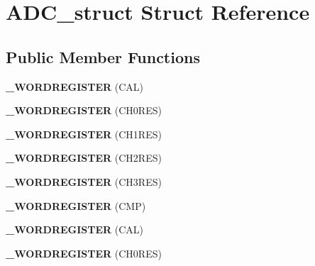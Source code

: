 \hypertarget{struct_a_d_c__struct}{}\section{A\+D\+C\+\_\+struct Struct Reference}
\label{struct_a_d_c__struct}
\subsection*{Public Member Functions}
\begin{DoxyCompactItemize}
\item 
{\bfseries \+\_\+\+W\+O\+R\+D\+R\+E\+G\+I\+S\+T\+ER} (C\+AL)\hypertarget{struct_a_d_c__struct_ab421dc830ed154a2e9acc357023215f9}{}\label{struct_a_d_c__struct_ab421dc830ed154a2e9acc357023215f9}

\item 
{\bfseries \+\_\+\+W\+O\+R\+D\+R\+E\+G\+I\+S\+T\+ER} (C\+H0\+R\+ES)\hypertarget{struct_a_d_c__struct_aa9eea8eae789e3fbecab731d0993d128}{}\label{struct_a_d_c__struct_aa9eea8eae789e3fbecab731d0993d128}

\item 
{\bfseries \+\_\+\+W\+O\+R\+D\+R\+E\+G\+I\+S\+T\+ER} (C\+H1\+R\+ES)\hypertarget{struct_a_d_c__struct_a7524b4641494c231ed83cd93013818c7}{}\label{struct_a_d_c__struct_a7524b4641494c231ed83cd93013818c7}

\item 
{\bfseries \+\_\+\+W\+O\+R\+D\+R\+E\+G\+I\+S\+T\+ER} (C\+H2\+R\+ES)\hypertarget{struct_a_d_c__struct_a388548845f09fe7a65eff4adb7470536}{}\label{struct_a_d_c__struct_a388548845f09fe7a65eff4adb7470536}

\item 
{\bfseries \+\_\+\+W\+O\+R\+D\+R\+E\+G\+I\+S\+T\+ER} (C\+H3\+R\+ES)\hypertarget{struct_a_d_c__struct_a8d0eedf8b8c593c56bdc32bca2386443}{}\label{struct_a_d_c__struct_a8d0eedf8b8c593c56bdc32bca2386443}

\item 
{\bfseries \+\_\+\+W\+O\+R\+D\+R\+E\+G\+I\+S\+T\+ER} (C\+MP)\hypertarget{struct_a_d_c__struct_a49df1732fb867f03722ff17fffcb4e9c}{}\label{struct_a_d_c__struct_a49df1732fb867f03722ff17fffcb4e9c}

\item 
{\bfseries \+\_\+\+W\+O\+R\+D\+R\+E\+G\+I\+S\+T\+ER} (C\+AL)\hypertarget{struct_a_d_c__struct_ab421dc830ed154a2e9acc357023215f9}{}\label{struct_a_d_c__struct_ab421dc830ed154a2e9acc357023215f9}

\item 
{\bfseries \+\_\+\+W\+O\+R\+D\+R\+E\+G\+I\+S\+T\+ER} (C\+H0\+R\+ES)\hypertarget{struct_a_d_c__struct_aa9eea8eae789e3fbecab731d0993d128}{}\label{struct_a_d_c__struct_aa9eea8eae789e3fbecab731d0993d128}


\end{DoxyCompactItemize}
